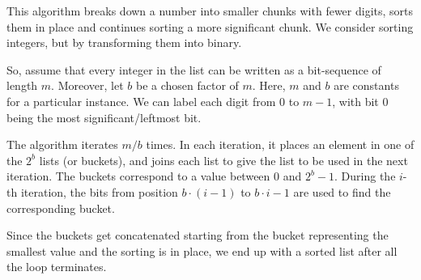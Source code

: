 \documentclass[a4paper, openany]{memoir}
\begin{document}
This algorithm breaks down a number into smaller chunks with fewer digits, sorts them in place and continues sorting a more significant chunk. We consider sorting integers, but by transforming them into binary.

So, assume that every integer in the list can be written as a bit-sequence of length $m$. Moreover, let $b$ be a chosen factor of $m$. Here, $m$ and $b$ are constants for a particular instance. We can label each digit from $0$ to $m-1$, with bit $0$ being the most significant/leftmost bit. 

The algorithm iterates $m/b$ times. In each iteration, it places an element in one of the $2^b$ lists (or buckets), and joins each list to give the list to be used in the next iteration. The buckets correspond to a value between $0$ and $2^b - 1$. During the $i$-th iteration, the bits from position $b \cdot (i - 1)$ to $b \cdot i - 1$ are used to find the corresponding bucket. 

Since the buckets get concatenated starting from the bucket representing the smallest value and the sorting is in place, we end up with a sorted list after all the loop terminates.
\end{document}
